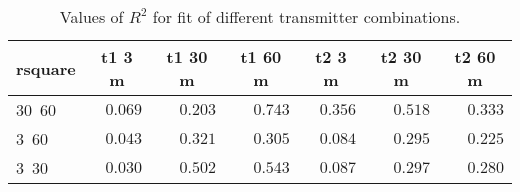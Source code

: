 %
\begin{table}[!tbp]
\caption{Values of $R^2$ for fit of different transmitter combinations.\label{tab:rsquare}} 
\begin{center}
\begin{tabular}{lrrrrrr}
\hline\hline
\multicolumn{1}{l}{rsquare}&\multicolumn{1}{c}{t1 3 m}&\multicolumn{1}{c}{t1 30 m}&\multicolumn{1}{c}{t1 60 m}&\multicolumn{1}{c}{t2 3 m}&\multicolumn{1}{c}{t2 30 m}&\multicolumn{1}{c}{t2 60 m}\tabularnewline
\hline
30~60&$0.069$&$0.203$&$0.743$&$0.356$&$0.518$&$0.333$\tabularnewline
3~60&$0.043$&$0.321$&$0.305$&$0.084$&$0.295$&$0.225$\tabularnewline
3~30&$0.030$&$0.502$&$0.543$&$0.087$&$0.297$&$0.280$\tabularnewline
\hline
\end{tabular}
\end{center}
\end{table}

